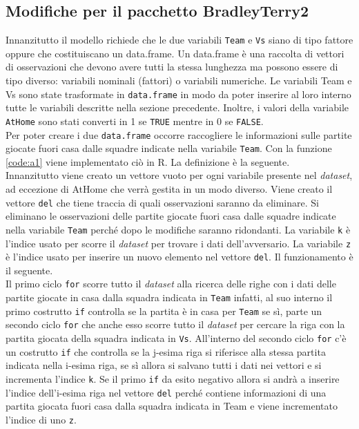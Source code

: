 \subsection{Modifiche per il pacchetto BradleyTerry2}
Innanzitutto il modello richiede che le due variabili \texttt{Team} e \texttt{Vs} siano di tipo fattore oppure che costituiscano un \textsf{data.frame}. Un \textsf{data.frame} è una raccolta di vettori di osservazioni che devono avere tutti la stessa lunghezza ma possono essere di tipo diverso: variabili nominali (fattori) o variabili numeriche.
Le variabili \textsf{Team} e \textsf{Vs} sono state trasformate in \texttt{data.frame} in modo da poter inserire al loro interno tutte le variabili descritte nella sezione precedente. Inoltre, i valori della variabile \texttt{AtHome} sono stati converti in 1 se \texttt{TRUE} mentre in 0 se \texttt{FALSE}.\\
Per poter creare i due \texttt{data.frame} occorre raccogliere le informazioni sulle partite giocate fuori casa dalle squadre indicate nella variabile \texttt{Team}. Con la funzione \ref{code:a1} viene implementato ciò in R. La definizione è la seguente.\\
Innanzitutto viene creato un vettore vuoto per ogni variabile presente nel \emph{dataset}, ad eccezione di \textsf{AtHome} che verrà gestita in un modo diverso. Viene creato il vettore \texttt{del} che tiene traccia di quali osservazioni saranno da eliminare. Si eliminano le osservazioni delle partite giocate fuori casa dalle squadre indicate nella variabile \texttt{Team} perché dopo le modifiche saranno ridondanti. La variabile \texttt{k} è l'indice usato per scorre il \emph{dataset} per trovare i dati dell'avversario. La variabile \texttt{z} è l'indice usato per inserire un nuovo elemento nel vettore \texttt{del}. Il funzionamento è il seguente.\\
Il primo ciclo \texttt{for} scorre tutto il \emph{dataset} alla ricerca delle righe con i dati delle partite giocate in casa dalla squadra indicata in \texttt{Team} infatti, al suo interno il primo costrutto \texttt{if} controlla se la partita è in casa per \texttt{Team} se sì, parte un secondo ciclo \texttt{for} che anche esso scorre tutto il \emph{dataset} per cercare la riga con la partita giocata della squadra indicata in \texttt{Vs}. All'interno del secondo ciclo \texttt{for} c'è un costrutto \texttt{if} che controlla se la j-esima riga si riferisce alla stessa partita indicata nella i-esima riga, se sì allora si salvano tutti i dati nei vettori e si incrementa l'indice \texttt{k}. Se il primo \texttt{if} da esito negativo allora si andrà a inserire l'indice dell'i-esima riga nel vettore \texttt{del} perché contiene informazioni di una partita giocata fuori casa dalla squadra indicata in \textsf{Team} e viene incrementato l'indice di uno \texttt{z}.\\
